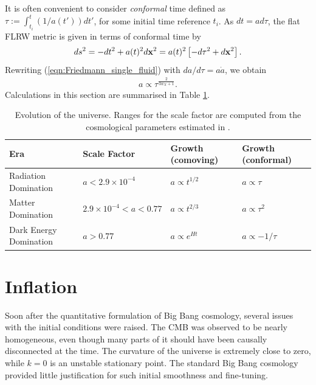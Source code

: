 It is often convenient to consider \textit{conformal} time defined as $\tau := \int_{t_i}^{t} (1/a(t')) dt'$, for some initial time reference $t_i$. As $dt = ad\tau$, the flat FLRW metric is given in terms of conformal time by
\begin{align}
	ds^2 = -dt^2 + a(t)^2 d\mathbf{x}^2 = a(t)^2 \left[ -d\tau^2 + d\mathbf{x}^2 \right]. \label{eqn:conformal_time}
\end{align}
Rewriting (\ref{eqn:Friedmann_single_fluid}) with $da/d\tau = a \dot{a}$, we obtain
\begin{align}
	a \propto \tau^\frac{2}{3w_X+1}.
\end{align}
Calculations in this section are summarised in Table \ref{table:evolution_of_the_universe}.
\begin{table}[h]
	\caption{Evolution of the universe. Ranges for the scale factor are computed from the cosmological parameters estimated in \cite{PlanckCollaboration2018Parameters}.}
	\centering
	\label{table:evolution_of_the_universe}
	\renewcommand{\arraystretch}{2} 
	\begin{tabular}{m{} m{}<{\centering} m{}<{\centering} m{}<{\centering} }
		\toprule
		Era & Scale Factor & Growth (comoving) & Growth (conformal) \\ 
		
		\toprule
		Radiation Domination & $a < 2.9 \times 10^{-4}$ & $a \propto t^{1/2}$ & $a \propto \tau$ \\
		\midrule
		Matter Domination & $ 2.9 \times 10^{-4} < a < 0.77 $ & $a \propto t^{2/3}$ & $a \propto \tau^2$ \\
		\midrule
		Dark Energy Domination & $a > 0.77$ & $a \propto e^{Ht}$ & $a \propto -1/\tau$ \\
		
		\bottomrule
	\end{tabular}
\end{table}

\section{Inflation}

Soon after the quantitative formulation of Big Bang cosmology, several issues with the initial conditions were raised. The CMB was observed to be nearly homogeneous, even though many parts of it should have been causally disconnected at the time. The curvature of the universe is extremely close to zero, while $k=0$ is an unstable stationary point. The standard Big Bang cosmology provided little justification for such initial smoothness and fine-tuning.

